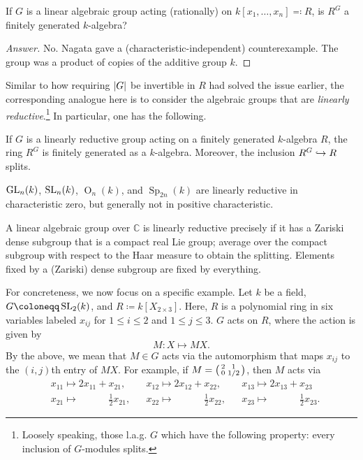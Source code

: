 \documentclass[12pt]{article}
\begin{document}
\begin{ques} \label{ques:hilbert-fourteen}
	If $G$ is a linear algebraic group acting (rationally) on $k[x_{1}, \ldots, x_{n}] \eqqcolon R$, is $R^{G}$ a finitely generated $k$-algebra?
\end{ques}
\begin{proof}[Answer]
	No. Nagata \cite{NagataFourteenthProblem} gave a (characteristic-independent) counterexample. The group was a product of copies of the additive group $k$.
\end{proof}

Similar to how requiring ${\left\lvert G \right\lvert}$ be invertible in $R$ had solved the issue earlier, the corresponding analogue here is to consider the algebraic groups that are \emph{linearly reductive}.\footnote{Loosely speaking, those l.a.g. $G$ which have the following property: every inclusion of $G$-modules splits.} In particular, one has the following.

\begin{thm}
	If $G$ is a linearly reductive group acting on a finitely generated $k$-algebra $R$, the ring $R^{G}$ is finitely generated as a $k$-algebra. Moreover, the inclusion $R^{G} \hookrightarrow R$ splits.
\end{thm}

\begin{ex}
	$\operatorname{GL}_{n}(k)$, $\operatorname{SL}_{n}(k)$, $\operatorname{O}_{n}(k)$, and $\operatorname{Sp}_{2n}(k)$ are linearly reductive in characteristic zero, but generally not in positive characteristic. 
\end{ex}

A linear algebraic group over $\mathbb{C}$ is linearly reductive precisely if it has a Zariski dense subgroup that is a compact real Lie group; average over the compact subgroup with respect to the Haar measure to obtain the splitting. Elements fixed by a (Zariski) dense subgroup are fixed by everything. 

For concreteness, we now focus on a specific example. Let $k$ be a field, $G \coloneqq \SL_{2}(k)$, and $R \coloneqq k[X_{2 \times 3}]$. Here, $R$ is a polynomial ring in six variables labeled $x_{ij}$ for $1 \le i \le 2$ and $1 \le j \le 3$. \newline
$G$ acts on $R$, where the action is given by
\begin{equation*} 
	M \colon X \mapsto MX.
\end{equation*}
By the above, we mean that $M \in G$ acts via the automorphism that maps $x_{ij}$ to the $(i,j)$th entry of $MX$. For example, if $M = \left(\begin{smallmatrix} 2 & 1 \\ 0 & 1/2 \end{smallmatrix}\right)$, then $M$ acts via
\begin{align*} 
	& x_{11} \mapsto 2 x_{11} + x_{21}, && x_{12} \mapsto 2 x_{12} + x_{22}, && x_{13} \mapsto 2 x_{13} + x_{23} \\
	& x_{21} \mapsto \phantom{2 x_{11} + } \tfrac{1}{2} x_{21}, && x_{22} \mapsto \phantom{2 x_{12} + } \tfrac{1}{2} x_{22}, && x_{23} \mapsto \phantom{2 x_{13} + } \tfrac{1}{2} x_{23}.
\end{align*}
\end{document}
